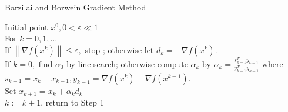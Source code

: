 \begin{algorithm}[H]
  \caption{Barzilai and Borwein Gradient Method}
  \label{alg:BB method}
  \begin{algorithmic}[1]
  \REQUIRE
Initial point $x^{0},0<\varepsilon \ll 1 $ \\
  \STATE For $k=0,1, \ldots$ \\
  \STATE If $\left\|\nabla f\left(x^{k}\right)\right\| \leq \varepsilon,$ stop ; otherwise let $d_{k}=-\nabla f\left(x^{k}\right)$. \\
  \STATE If $k=0,$ find $\alpha_{0}$ by line search; otherwise compute $\alpha_{k}$ by 
  $
  \alpha_{k}=\frac{s_{k-1}^{T} y_{k-1}}{y_{k-1}^{T} y_{k-1}}
  $
  where $s_{k-1}=x_{k}-x_{k-1}, y_{k-1}=\nabla f\left(x^{k}\right)-\nabla f\left(x^{k-1}\right)$. \\
  \STATE Set $x_{k+1}=x_{k}+\alpha_{k} d_{k}$ \\
  \STATE $k:=k+1$, return to Step 1 \\
  \end{algorithmic}
\end{algorithm}





